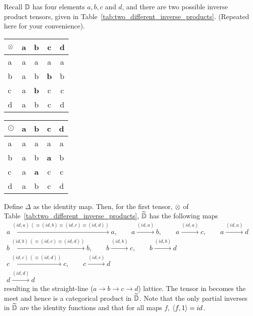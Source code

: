Recall $\mathbb{D}$ has four elements $a,b,c$ and $d$, and there are two possible inverse product tensors,
given in Table~\ref{tab:two_different_inverse_products}. (Repeated here for your convenience).
\begin{table*}[h!]
  \begin{center}
  \begin{tabular}{|l||c|c|c|c|}
    \hline
    $\otimes$&a&b&c&d\\ \hline \hline
    a&a&a&a&a\\ \hline
    b&a&b&\textbf{b}&b\\ \hline
    c&a&\textbf{b}&c&c \\ \hline
    d&a&b&c&d \\ \hline
  \end{tabular}
  \qquad
  \begin{tabular}{|l||c|c|c|c|} \hline
    $\odot$&a&b&c&d\\ \hline \hline
    a&a&a&a&a\\ \hline
    b&a&b&\textbf{a}&b\\ \hline
    c&a&\textbf{a}&c&c \\ \hline
    d&a&b&c&d \\ \hline
  \end{tabular}
  \end{center}
  \caption[]{Two different inverse products on the same category.} %
\end{table*}


Define $\Delta$ as the identity map. Then, for the first tensor, $\otimes$ of
Table~\ref{tab:two_different_inverse_products}, $\widetilde{\mathbb{D}}$ has the following
maps
\begin{align*}
  a \xrightarrow{(id,a)\ (\equiv (id, b) \equiv (id,c) \equiv (id,d))} a, \qquad a
    \xrightarrow{(id,a)} b, \qquad a \xrightarrow{(id, a)} c , \qquad a \xrightarrow{(id, a)} d \\
  b \xrightarrow{(id,b) \ (\equiv (id, c) \equiv (id, d))} b , \qquad b \xrightarrow{(id,b)} c,
    \qquad b \xrightarrow{(id,b)} d\\
  c \xrightarrow{(id, c) \ (\equiv (id, d))} c ,   \qquad c \xrightarrow{(id,c)} d\\
  d \xrightarrow{(id,d)} d
\end{align*}
resulting in the straight-line ($a \to b \to c \to d$) lattice. The tensor in \D becomes the meet
and hence is a categorical product in $\widetilde{\mathbb{D}}$. Note that the only partial inverses in
$\widetilde{\mathbb{D}}$ are the identity functions and that for all maps $f$, $\langle f,1\rangle = id$.

